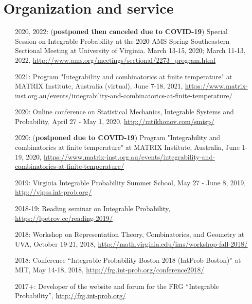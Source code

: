 \documentclass[letterpaper,11pt]{article}
\begin{document}
	
\section*{Organization and service}

\begin{itemize}
	\item [2020, 2022:]
	(\textbf{postponed then canceled due to COVID-19})
		Special Session on Integrable Probability
		at the 2020 AMS Spring Southeastern Sectional Meeting at 
		University of Virginia.
		March 13-15, 2020; March 11-13, 2022,
		\url{http://www.ams.org/meetings/sectional/2273_program.html}
	
	\item [2021:]
		Program "Integrability and combinatorics at finite temperature"
		at MATRIX Institute, Australia
		(virtual),
		June 7-18, 2021,
		\url{https://www.matrix-inst.org.au/events/integrability-and-combinatorics-at-finite-temperature/}
	\item [2020:]
	Online conference on Statistical Mechanics, Integrable Systems and Probability,
	April 27 - May 1, 2020,
	\url{http://mtikhonov.com/smisp/}
	\item [2020:]
	(\textbf{postponed due to COVID-19})
	Program "Integrability and combinatorics at finite temperature"
	at MATRIX Institute,
	Australia,
	June 1-19, 2020,
	\url{https://www.matrix-inst.org.au/events/integrability-and-combinatorics-at-finite-temperature/}
	
	\item [2019:]
		Virginia Integrable Probability Summer School,
		May 27 - June 8, 2019,
		\url{http://vipss.int-prob.org/}

	\item[2018-19:]
		Reading seminar on Integrable Probability,
	      \url{https://lpetrov.cc/reading-2019/}
		

	\item [2018:]
		Workshop on Representation Theory, Combinatorics, and Geometry
		at UVA,
		October 19-21, 2018,
		\url{http://math.virginia.edu/ims/workshop-fall-2018/}

	\item [2018:]
		Conference 
		``Integrable Probability Boston 2018 (IntProb Boston)''
		at MIT,
		May 14-18, 2018,
		\url{http://frg.int-prob.org/conference2018/}

	\item [2017+:]
		Developer of the website and forum for the FRG ``Integrable Probability'',
		\url{http://frg.int-prob.org/}


\end{itemize}
\end{document}

